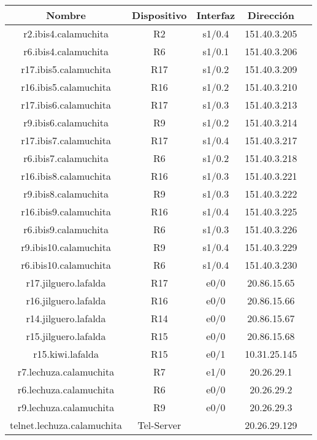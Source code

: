 \begin{tabular}{|c|c|c|c|c|}
	\hline
	Nombre & Dispositivo & Interfaz & Dirección \\
	\hline

	\hline
	r2.ibis4.calamuchita & R2 & s1/0.4 & 151.40.3.205 \\
	\hline
	r6.ibis4.calamuchita & R6 & s1/0.1 & 151.40.3.206 \\
	\hline

	\hline
	r17.ibis5.calamuchita & R17 & s1/0.2 & 151.40.3.209 \\
	\hline
	r16.ibis5.calamuchita & R16 & s1/0.2 & 151.40.3.210 \\
	\hline

	\hline
	r17.ibis6.calamuchita & R17 & s1/0.3 & 151.40.3.213 \\
	\hline
	r9.ibis6.calamuchita & R9 & s1/0.2 & 151.40.3.214 \\
	\hline

	\hline
	r17.ibis7.calamuchita & R17 & s1/0.4 & 151.40.3.217 \\
	\hline
	r6.ibis7.calamuchita & R6 & s1/0.2 & 151.40.3.218 \\
	\hline

	\hline
	r16.ibis8.calamuchita & R16 & s1/0.3 & 151.40.3.221 \\
	\hline
	r9.ibis8.calamuchita & R9 & s1/0.3 & 151.40.3.222 \\
	\hline

	\hline
	r16.ibis9.calamuchita & R16 & s1/0.4 & 151.40.3.225 \\
	\hline
	r6.ibis9.calamuchita & R6 & s1/0.3 & 151.40.3.226 \\
	\hline

	\hline
	r9.ibis10.calamuchita & R9 & s1/0.4 & 151.40.3.229 \\
	\hline
	r6.ibis10.calamuchita & R6 & s1/0.4 & 151.40.3.230 \\
	\hline

	\hline
	r17.jilguero.lafalda & R17 & e0/0 & 20.86.15.65 \\
	\hline
	r16.jilguero.lafalda & R16 & e0/0 & 20.86.15.66 \\
	\hline
	r14.jilguero.lafalda & R14 & e0/0 & 20.86.15.67 \\
	\hline
	r15.jilguero.lafalda & R15 & e0/0 & 20.86.15.68 \\
	\hline

	\hline
	r15.kiwi.lafalda & R15 & e0/1 & 10.31.25.145 \\
	\hline

	\hline
	r7.lechuza.calamuchita & R7 & e1/0 & 20.26.29.1 \\
	\hline
	r6.lechuza.calamuchita & R6 & e0/0 & 20.26.29.2 \\
	\hline
	r9.lechuza.calamuchita & R9 & e0/0 & 20.26.29.3 \\
	\hline
	telnet.lechuza.calamuchita & Tel-Server & & 20.26.29.129 \\
	\hline


\end{tabular}
